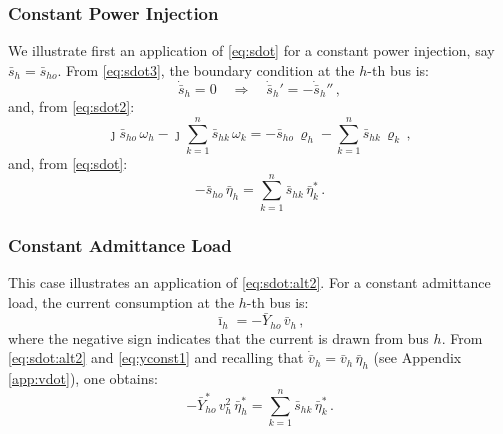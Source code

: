 \documentclass[journal, twocolumn, letter]{IEEEtran}
\newcommand{\vh}{v_h}
\newcommand{\vhbar}{\bar{v}_h}
\newcommand{\shdot}{\dot{\bar{s}}_h}
\newcommand{\vhbardot}{\dot{\bar{v}}_h}
\newcommand{\etah}{\bar{\eta}_h}
\newcommand{\etak}{\bar{\eta}_k}
\newcommand{\rhoh}{\varrho_h}
\newcommand{\rhok}{\varrho_k}
\newcommand{\sh}{\bar{s}_h}
\newcommand{\sho}{\bar{s}_{ho}}
\newcommand{\shk}{\bar{s}_{hk}}
\newcommand{\wh}{\omega_h}
\newcommand{\wk}{\omega_k}
\newcommand{\sk}{{\textstyle \sum}_{k=1}^{n}}
\newcommand{\ii}{\imath}
\newcommand{\jj}{\jmath}
\newcommand{\ih}{\bar{\ii}_{h}}
\newcommand{\yho}{\bar{Y}_{ho}}
\begin{document}
\subsubsection{Constant Power Injection}

We illustrate first an application of \eqref{eq:sdot} for a constant
power injection, say $\sh = \sho$.  From \eqref{eq:sdot3}, the
boundary condition at the $h$-th bus is:
\begin{equation}
  \label{eq:pconst2}
  \shdot = 0 \quad \Rightarrow \quad \shdot' = -\shdot'' \, ,
\end{equation}
and, from \eqref{eq:sdot2}:
\begin{equation}
  \label{eq:pconst4}
  \jj \sho \, \wh - \jj \sk \shk \, \wk =
  - \sho \, \rhoh - \sk \shk \, \rhok \, ,
\end{equation}
and, from \eqref{eq:sdot}:
\begin{equation}
  \label{eq:pconst5}
  - \sho \, \etah = \sk \shk \, \etak^* \, .
\end{equation}

\subsubsection{Constant Admittance Load}
\label{sub:yconst}

This case illustrates an application of \eqref{eq:sdot:alt2}.  For a
constant admittance load, the current consumption at the $h$-th bus
is:
\begin{equation}
  \label{eq:yconst1}
  \ih = - \yho \, \vhbar \, ,
\end{equation}
where the negative sign indicates that the current is drawn from bus
$h$.  From \eqref{eq:sdot:alt2} and \eqref{eq:yconst1} and recalling
that $\vhbardot = \vhbar \, \etah$ (see Appendix \ref{app:vdot}), one
obtains:
\begin{equation}
  \label{eq:yconst2}
  - \yho^* \, \vh^2 \, \etah^* = \sk \shk \, \etak^* \, .
\end{equation}
\end{document}
